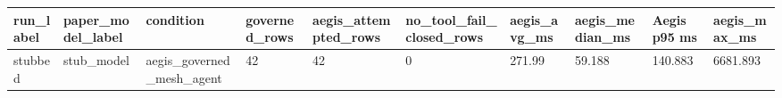 \begin{tabular}{llllllllll}
 \hline
run\_label & paper\_model\_label & condition & governed\_rows & aegis\_attempted\_rows & no\_tool\_fail\_closed\_rows & aegis\_avg\_ms & aegis\_median\_ms & Aegis p95 ms & aegis\_max\_ms \\
 \hline
stubbed & stub\_model & aegis\_governed\_mesh\_agent & 42 & 42 & 0 & 271.99 & 59.188 & 140.883 & 6681.893 \\
 \hline
\end{tabular}

